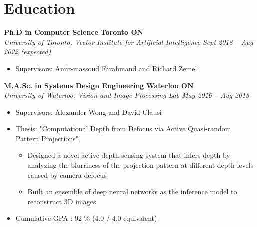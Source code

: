 \section*{Education}
\vspace{\postsubhead}
    \textbf{Ph.D in Computer Science}
    \hfill
    \textbf{Toronto ON}\\
    \textit{University of Toronto, Vector Institute for Artificial Intelligence}
    \hfill
    \textit{Sept 2018 -- Aug 2022 (expected)}
    \begin{itemize}
        \item Supervisors: Amir-massoud Farahmand and Richard Zemel
    \end{itemize}
    \vspace{\interlist}
    
    \textbf{M.A.Sc. in Systems Design Engineering}
    \hfill
    \textbf{Waterloo ON}\\
    \textit{University of Waterloo, Vision and Image Processing Lab}
    \hfill
    \textit{May 2016 -- Aug 2018}
    \begin{itemize}
        \item Supervisors: Alexander Wong and David Clausi
        \item Thesis: \href{https://uwspace.uwaterloo.ca/handle/10012/13645}{"Computational Depth from Defocus via Active Quasi-random Pattern Projections"}
        \begin{itemize}
            \item Designed a novel active depth sensing system that infers depth by analyzing the blurriness of the projection pattern at different depth levels caused by camera defocus
            \item Built an ensemble of deep neural networks as the inference model to reconstruct 3D images
        \end{itemize}
        \item Cumulative GPA : 92 \% (4.0 / 4.0 equivalent) 
    \end{itemize}
    \vspace{\interlist}

